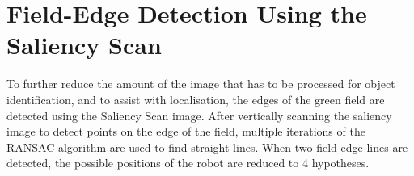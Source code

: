 \documentclass[runningheads,a4paper]{llncs}
\begin{document}
\section{Field-Edge Detection Using the Saliency Scan}

To further reduce the amount of the image that has to be processed for object
identification, and to assist with localisation, the edges of the green field
are detected using the Saliency Scan image. After vertically scanning the saliency image to detect points on the
edge of the field, multiple
iterations of the RANSAC algorithm\cite{Fischler:1981:RSC:358669.358692} are
used to find straight lines. When two field-edge lines are detected, the
possible positions of the robot are reduced to 4 hypotheses.
\end{document}
